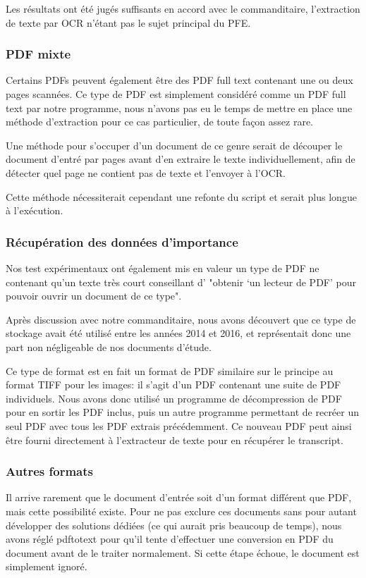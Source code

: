 Les résultats ont été jugés suffisants en accord avec le commanditaire, l'extraction de texte par OCR n'étant pas le sujet principal du PFE\@.

\subsubsection{PDF mixte}
Certains PDFs peuvent également être des PDF full text contenant une ou deux pages scannées.
Ce type de PDF est simplement considéré comme un PDF full text par notre programme, nous n'avons pas eu le temps de mettre en place une méthode d'extraction pour ce cas particulier, de toute façon assez rare.

Une méthode pour s'occuper d'un document de ce genre serait de découper le document d'entré par pages avant d'en extraire le texte individuellement, afin de détecter quel page ne contient pas de texte et l'envoyer à l'OCR\@.

Cette méthode nécessiterait cependant une refonte du script et serait plus longue à l'exécution.

\subsubsection{Récupération des données d'importance}
Nos test expérimentaux ont également mis en valeur un type de PDF ne contenant qu'un texte très court conseillant d' "obtenir `un lecteur de PDF' pour pouvoir ouvrir un document de ce type".

Après discussion avec notre commanditaire, nous avons découvert que ce type de stockage avait été utilisé entre les années 2014 et 2016, et représentait donc une part non négligeable de nos documents d'étude.

Ce type de format est en fait un format de PDF similaire sur le principe au format TIFF pour les images: il s'agit d'un PDF contenant une suite de PDF individuels.
Nous avons donc utilisé un programme de décompression de PDF pour en sortir les PDF inclus, puis un autre programme permettant de recréer un seul PDF avec tous les PDF extrais précédemment.
Ce nouveau PDF peut ainsi être fourni directement à l'extracteur de texte pour en récupérer le transcript.

\subsubsection{Autres formats}
Il arrive rarement que le document d'entrée soit d'un format différent que PDF, mais cette possibilité existe.
Pour ne pas exclure ces documents sans pour autant développer des solutions dédiées (ce qui aurait pris beaucoup de temps), nous avons réglé pdftotext pour qu'il tente d'effectuer une conversion en PDF du document avant de le traiter normalement.
Si cette étape échoue, le document est simplement ignoré.



